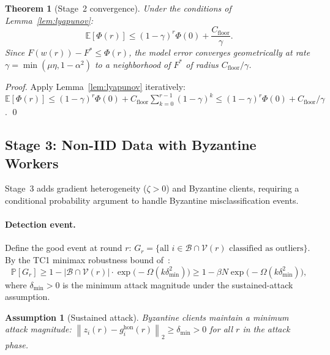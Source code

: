 \documentclass{article}
\newtheorem{theorem}{Theorem}
\newtheorem{assumption}{Assumption}
\newcommand{\E}{\mathbb{E}}
\renewcommand{\Pr}{\mathbb{P}}
\newcommand{\norm}[1]{\left\lVert #1 \right\rVert}
\newcommand{\calB}{\mathcal{B}}
\newcommand{\calV}{\mathcal{V}}
\newcommand{\LyapV}{\Phi}
\begin{document}
\begin{theorem}[Stage~2 convergence]
\label{thm:stage2}
Under the conditions of Lemma~\ref{lem:lyapunov}:
\[
  \E[\LyapV(r)] \leq (1-\gamma)^r \LyapV(0) + \frac{C_{\mathrm{floor}}}{\gamma}.
\]
Since $F(w(r)) - F^* \leq \LyapV(r)$, the model error converges geometrically
at rate $\gamma = \min(\mu\eta, 1-\alpha^2)$ to a neighborhood of $F^*$
of radius $C_{\mathrm{floor}}/\gamma$.
\end{theorem}

\begin{proof}
Apply Lemma~\ref{lem:lyapunov} iteratively:
$\E[\LyapV(r)] \leq (1-\gamma)^r\LyapV(0) + C_{\mathrm{floor}}\sum_{k=0}^{r-1}(1-\gamma)^k
\leq (1-\gamma)^r\LyapV(0) + C_{\mathrm{floor}}/\gamma$. \qed
\end{proof}

\subsection{Stage 3: Non-IID Data with Byzantine Workers}
\label{sec:stage3}

Stage~3 adds gradient heterogeneity ($\zeta > 0$) and Byzantine clients,
requiring a conditional probability argument to handle Byzantine
misclassification events.

\paragraph{Detection event.}
Define the good event at round $r$:
$G_r = \{\text{all } i \in \calB \cap \calV(r) \text{ classified as outliers}\}$.
By the TC1 minimax robustness bound of~\citet{paper1}:
\begin{equation}
  \Pr[G_r]
  \geq 1 - |\calB \cap \calV(r)| \cdot \exp\bigl(-\Omega(k\delta_{\min}^2)\bigr)
  \geq 1 - \beta N \exp\bigl(-\Omega(k\delta_{\min}^2)\bigr),
  \label{eq:detection_prob}
\end{equation}
where $\delta_{\min} > 0$ is the minimum attack magnitude under the
sustained-attack assumption.

\begin{assumption}[Sustained attack]
\label{assump:attack}
Byzantine clients maintain a minimum attack magnitude:
$\norm{z_i(r) - g_i^{\mathrm{hon}}(r)}_2 \geq \delta_{\min} > 0$
for all $r$ in the attack phase.
\end{assumption}
\end{document}
